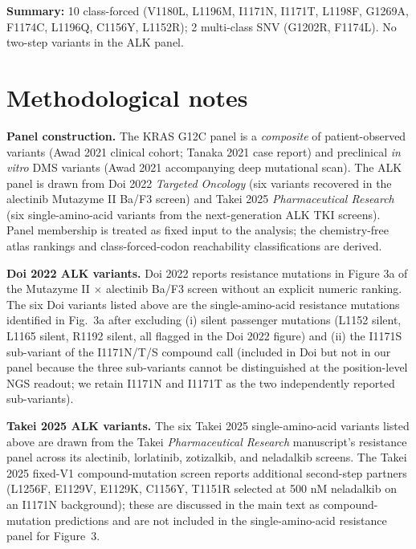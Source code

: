 \documentclass[10pt,a4paper,landscape]{article}
\begin{document}
\vspace{4pt}
\noindent\footnotesize
\textbf{Summary:} 10 class-forced (V1180L, L1196M, I1171N, I1171T, L1198F, G1269A, F1174C, L1196Q, C1156Y, L1152R); 2 multi-class SNV (G1202R, F1174L). No two-step variants in the ALK panel.

\vspace{18pt}
\normalsize

\section*{Methodological notes}

\footnotesize

\noindent\textbf{Panel construction.} The KRAS G12C panel is a \emph{composite} of patient-observed variants (Awad 2021 clinical cohort; Tanaka 2021 case report) and preclinical \emph{in vitro} DMS variants (Awad 2021 accompanying deep mutational scan). The ALK panel is drawn from Doi 2022 \emph{Targeted Oncology} (six variants recovered in the alectinib Mutazyme II Ba/F3 screen) and Takei 2025 \emph{Pharmaceutical Research} (six single-amino-acid variants from the next-generation ALK TKI screens). Panel membership is treated as fixed input to the analysis; the chemistry-free atlas rankings and class-forced-codon reachability classifications are derived.

\vspace{4pt}

\noindent\textbf{Doi 2022 ALK variants.} Doi 2022 reports resistance mutations in Figure 3a of the Mutazyme II $\times$ alectinib Ba/F3 screen without an explicit numeric ranking. The six Doi variants listed above are the single-amino-acid resistance mutations identified in Fig.~3a after excluding (i) silent passenger mutations (L1152 silent, L1165 silent, R1192 silent, all flagged in the Doi 2022 figure) and (ii) the I1171S sub-variant of the I1171N/T/S compound call (included in Doi but not in our panel because the three sub-variants cannot be distinguished at the position-level NGS readout; we retain I1171N and I1171T as the two independently reported sub-variants).

\vspace{4pt}

\noindent\textbf{Takei 2025 ALK variants.} The six Takei 2025 single-amino-acid variants listed above are drawn from the Takei \emph{Pharmaceutical Research} manuscript's resistance panel across its alectinib, lorlatinib, zotizalkib, and neladalkib screens. The Takei 2025 fixed-V1 compound-mutation screen reports additional second-step partners (L1256F, E1129V, E1129K, C1156Y, T1151R selected at 500 nM neladalkib on an I1171N background); these are discussed in the main text as compound-mutation predictions and are not included in the single-amino-acid resistance panel for Figure~3.
\end{document}
